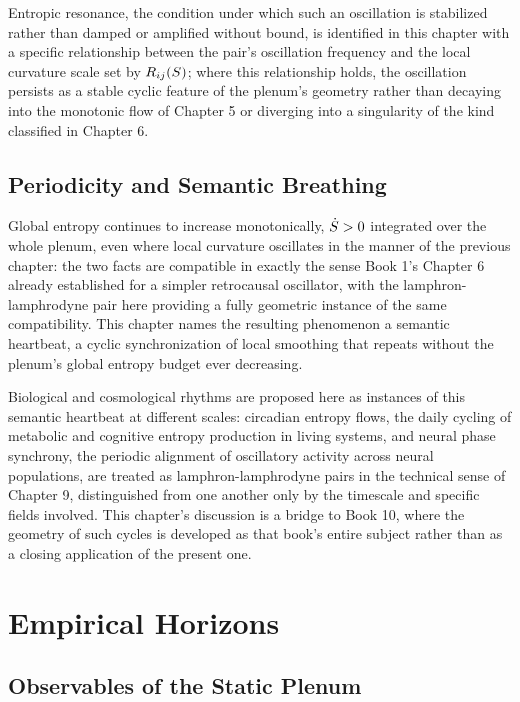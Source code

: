 Entropic resonance, the condition under which such an oscillation is stabilized rather than damped or amplified without bound, is identified in this chapter with a specific relationship between the pair's oscillation frequency and the local curvature scale set by $R_{ij}(S)$; where this relationship holds, the oscillation persists as a stable cyclic feature of the plenum's geometry rather than decaying into the monotonic flow of Chapter 5 or diverging into a singularity of the kind classified in Chapter 6.

\chapter{Periodicity and Semantic Breathing}

Global entropy continues to increase monotonically, $\dot{S} > 0$ integrated over the whole plenum, even where local curvature oscillates in the manner of the previous chapter: the two facts are compatible in exactly the sense Book 1's Chapter 6 already established for a simpler retrocausal oscillator, with the lamphron-lamphrodyne pair here providing a fully geometric instance of the same compatibility. This chapter names the resulting phenomenon a semantic heartbeat, a cyclic synchronization of local smoothing that repeats without the plenum's global entropy budget ever decreasing.

Biological and cosmological rhythms are proposed here as instances of this semantic heartbeat at different scales: circadian entropy flows, the daily cycling of metabolic and cognitive entropy production in living systems, and neural phase synchrony, the periodic alignment of oscillatory activity across neural populations, are treated as lamphron-lamphrodyne pairs in the technical sense of Chapter 9, distinguished from one another only by the timescale and specific fields involved. This chapter's discussion is a bridge to Book 10, where the geometry of such cycles is developed as that book's entire subject rather than as a closing application of the present one.

\part{Empirical Horizons}

\chapter{Observables of the Static Plenum}

